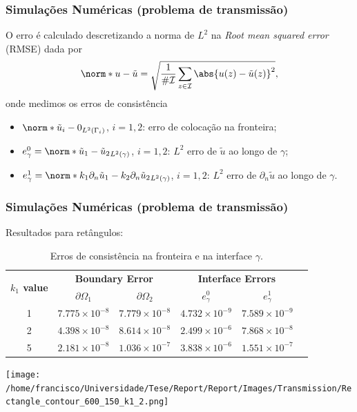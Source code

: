 \documentclass[portuguese,notheorems]{beamer}
\begin{document}
\begin{frame}\frametitle{Simulações Numéricas (problema de transmissão)}
    O erro é calculado descretizando a norma de \(L^2\) na \textit{Root mean squared error} (RMSE) dada por
    \[
    \norm*{u-\tilde{u}}= \sqrt{\frac{1}{\#\mathcal{I}} \sum_{z \in \mathcal{I}} \abs{u(z)-\tilde{u}(z)}^2},
    \]
    \pause
    onde medimos os erros de consistência
    \begin{itemize}
        \item \(\norm*{\tilde{u}_i - 0}_{L^2(\Gamma_i)}\), \(i=1, 2\): erro de colocação na fronteira;
        \item \(e_\gamma^0 = \norm*{\tilde{u}_1 - \tilde{u}_2}_{L^2(\gamma)}\), \(i=1, 2\): \(L^2\) erro de \(\tilde{u}\) ao longo de \(\gamma\);
        \item \(e_\gamma^1 = \norm*{k_1 \partial_n\tilde{u}_1 - k_2 \partial_n\tilde{u}_2}_{L^2(\gamma)}\), \(i=1, 2\): \(L^2\) erro de \(\partial_n\tilde{u}\) ao longo de  \(\gamma\).
    \end{itemize}
\end{frame}

\begin{frame}\frametitle{Simulações Numéricas (problema de transmissão)}
    Resultados para retângulos:
    \begin{table}
        \centering
        \scriptsize %
        \setlength{\tabcolsep}{2pt} %
        \begin{tabular}{@{}cccccc@{}}
          \toprule
          \multirow{2}{*}{\textbf{\(k_1\) value}} & \multicolumn{2}{c}{\textbf{Boundary Error}} & \multicolumn{2}{c}{\textbf{Interface Errors}} \\
          \cmidrule(lr){2-3} \cmidrule(lr){4-5}
          & \textbf{$\partial\Omega_1$} & \textbf{$\partial\Omega_2$} & \textbf{\(e_\gamma^0\)} & \textbf{\(e_\gamma^1\)} & \\
          \midrule
          1 & $7.775\times10^{-8}$ & $7.779\times10^{-8}$ & $4.732\times10^{-9}$ & $7.589\times10^{-9}$\\
          2 & $4.398\times10^{-8}$ & $8.614\times10^{-8}$ & $2.499\times10^{-6}$ & $7.868\times10^{-8}$\\
          5 & $2.181\times10^{-8}$ & $1.036\times10^{-7}$ & $3.838\times10^{-6}$ & $1.551\times10^{-7}$\\
          \bottomrule
        \end{tabular}
        \caption{Erros de consistência na fronteira e na interface \(\gamma\).}
        \label{tab:transmission_results_rectangle}
    \end{table}
    \begin{minipage}{0.6\textwidth} %
        \centering
        \texttt{[image: /home/francisco/Universidade/Tese/Report/Report/Images/Transmission/Rectangle\_contour\_600\_150\_k1\_2.png]}
    \end{minipage}%
    \begin{minipage}{0.4\textwidth} %
    \end{minipage}
\end{frame}
\end{document}
